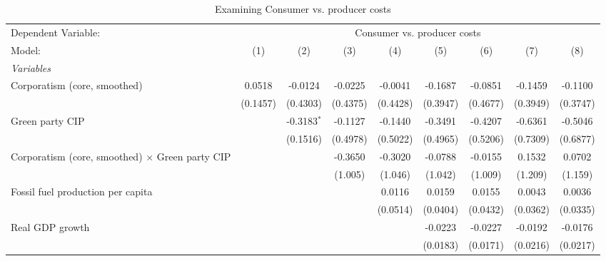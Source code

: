 
\begin{table}[htbp]
   \caption{Examining Consumer vs. producer costs}
   \centering
   \begin{tabular}{lcccccccc}
      \tabularnewline \midrule \midrule
      Dependent Variable: & \multicolumn{8}{c}{Consumer vs. producer costs}\\
      Model:                                                 & (1)      & (2)           & (3)      & (4)      & (5)      & (6)      & (7)      & (8)\\  
      \midrule
      \emph{Variables}\\
      Corporatism (core, smoothed)                           & 0.0518   & -0.0124       & -0.0225  & -0.0041  & -0.1687  & -0.0851  & -0.1459  & -0.1100\\   
                                                             & (0.1457) & (0.4303)      & (0.4375) & (0.4428) & (0.3947) & (0.4677) & (0.3949) & (0.3747)\\   
      Green party CIP                                        &          & -0.3183$^{*}$ & -0.1127  & -0.1440  & -0.3491  & -0.4207  & -0.6361  & -0.5046\\   
                                                             &          & (0.1516)      & (0.4978) & (0.5022) & (0.4965) & (0.5206) & (0.7309) & (0.6877)\\   
      Corporatism (core, smoothed) $\times$ Green party CIP  &          &               & -0.3650  & -0.3020  & -0.0788  & -0.0155  & 0.1532   & 0.0702\\   
                                                             &          &               & (1.005)  & (1.046)  & (1.042)  & (1.009)  & (1.209)  & (1.159)\\   
      Fossil fuel production per capita                      &          &               &          & 0.0116   & 0.0159   & 0.0155   & 0.0043   & 0.0036\\   
                                                             &          &               &          & (0.0514) & (0.0404) & (0.0432) & (0.0362) & (0.0335)\\   
      Real GDP growth                                        &          &               &          &          & -0.0223  & -0.0227  & -0.0192  & -0.0176\\   
                                                             &          &               &          &          & (0.0183) & (0.0171) & (0.0216) & (0.0217)\\   

\end{tabular}
\end{table}
